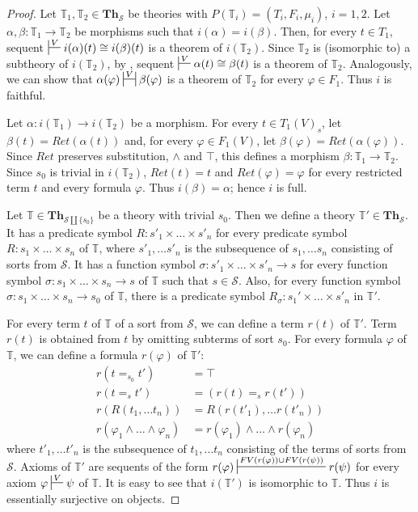 \documentclass[reqno]{amsart}
\theoremstyle{definition}
\theoremstyle{remark}
\newcommand{\cat}[1]{\mathbf{#1}}
\newcommand{\Th}{\cat{Th}}
\numberwithin{figure}{section}
\begin{document}
\begin{proof}
Let $\mathbb{T}_1,\mathbb{T}_2 \in \Th_\mathcal{S}$ be theories with $P(\mathbb{T}_i) = (T_i,F_i,\mu_i)$, $i = 1,2$.
Let $\alpha,\beta : \mathbb{T}_1 \to \mathbb{T}_2$ be morphisms such that $i(\alpha) = i(\beta)$.
Then, for every $t \in T_1$, sequent $\sststile{}{V} i(\alpha)(t) \cong i(\beta)(t)$ is a theorem of $i(\mathbb{T}_2)$.
Since $\mathbb{T}_2$ is (isomorphic to) a subtheory of $i(\mathbb{T}_2)$, by , sequent $\sststile{}{V} \alpha(t) \cong \beta(t)$ is a theorem of $\mathbb{T}_2$.
Analogously, we can show that $\alpha(\varphi) \ssststile{}{V} \beta(\varphi)$ is a theorem of $\mathbb{T}_2$ for every $\varphi \in F_1$.
Thus $i$ is faithful.

Let $\alpha : i(\mathbb{T}_1) \to i(\mathbb{T}_2)$ be a morphism.
For every $t \in T_1(V)_s$, let $\beta(t) = Ret(\alpha(t))$ and, for every $\varphi \in F_1(V)$, let $\beta(\varphi) = Ret(\alpha(\varphi))$.
Since $Ret$ preserves substitution, $\land$ and $\top$, this defines a morphism $\beta : \mathbb{T}_1 \to \mathbb{T}_2$.
Since $s_0$ is trivial in $i(\mathbb{T}_2)$, $Ret(t) = t$ and $Ret(\varphi) = \varphi$ for every restricted term $t$ and every formula $\varphi$.
Thus $i(\beta) = \alpha$; hence $i$ is full.

Let $\mathbb{T} \in \Th_{\mathcal{S} \amalg \{ s_0 \}}$ be a theory with trivial $s_0$.
Then we define a theory $\mathbb{T}' \in \Th_\mathcal{S}$.
It has a predicate symbol $R : s'_1 \times \ldots \times s'_n$ for every predicate symbol $R : s_1 \times \ldots \times s_n$ of $\mathbb{T}$,
    where $s'_1, \ldots s'_n$ is the subsequence of $s_1, \ldots s_n$ consisting of sorts from $\mathcal{S}$.
It has a function symbol $\sigma : s'_1 \times \ldots \times s'_n \to s$ for every function symbol
    $\sigma : s_1 \times \ldots \times s_n \to s$ of $\mathbb{T}$ such that $s \in \mathcal{S}$.
Also, for every function symbol $\sigma : s_1 \times \ldots \times s_n \to s_0$ of $\mathbb{T}$,
    there is a predicate symbol $R_\sigma : s_1' \times \ldots \times s'_n$ in $\mathbb{T}'$.

For every term $t$ of $\mathbb{T}$ of a sort from $\mathcal{S}$, we can define a term $r(t)$ of $\mathbb{T}'$.
Term $r(t)$ is obtained from $t$ by omitting subterms of sort $s_0$.
For every formula $\varphi$ of $\mathbb{T}$, we can define a formula $r(\varphi)$ of $\mathbb{T}'$:
\begin{align*}
r(t =_{s_0} t') & = \top \\
r(t =_s t') & = (r(t) =_s r(t')) \\
r(R(t_1, \ldots t_n)) & = R(r(t'_1), \ldots r(t'_n)) \\
r(\varphi_1 \land \ldots \land \varphi_n) & = r(\varphi_1) \land \ldots \land r(\varphi_n)
\end{align*}
where $t'_1, \ldots t'_n$ is the subsequence of $t_1, \ldots t_n$ consisting of the terms of sorts from $\mathcal{S}$.
Axioms of $\mathbb{T}'$ are sequents of the form $r(\varphi) \sststile{}{FV(r(\varphi)) \cup FV(r(\psi))} r(\psi)$ for every axiom $\varphi \sststile{}{V} \psi$ of $\mathbb{T}$.
It is easy to see that $i(\mathbb{T}')$ is isomorphic to $\mathbb{T}$.
Thus $i$ is essentially surjective on objects.
\end{proof}
\end{document}
